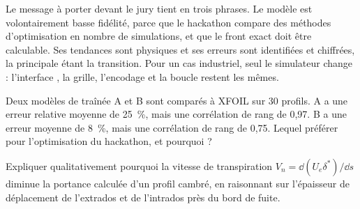 \begin{projet}
Le message à porter devant le jury tient en trois phrases. Le modèle est volontairement basse fidélité, parce que le hackathon compare des méthodes d'optimisation en nombre de simulations, et que le front exact doit être calculable. Ses tendances sont physiques et ses erreurs sont identifiées et chiffrées, la principale étant la transition. Pour un cas industriel, seul le simulateur change : l'interface , la grille, l'encodage et la boucle restent les mêmes.
\end{projet}

\exercices
\begin{exercice}
Deux modèles de traînée A et B sont comparés à XFOIL sur 30 profils. A a une erreur relative moyenne de 25~\%, mais une corrélation de rang de 0,97. B a une erreur moyenne de 8~\%, mais une corrélation de rang de 0,75. Lequel préférer pour l'optimisation du hackathon, et pourquoi ?
\end{exercice}
\begin{exercice}
Expliquer qualitativement pourquoi la vitesse de transpiration $V_n=\dd(U_e\delta^*)/\dd s$ diminue la portance calculée d'un profil cambré, en raisonnant sur l'épaisseur de déplacement de l'extrados et de l'intrados près du bord de fuite.
\end{exercice}
